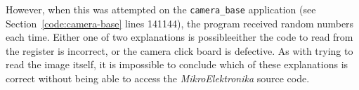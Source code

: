 However, when this was attempted on the \texttt{camera\_base} application
(see Section~\ref{code:camera-base} lines 141\textendash{}144), the program
received random numbers each time.  Either one of two explanations is
possible\textemdash{}either the code to read from the register is incorrect,
or the camera click board is defective. As with trying to read the image
itself, it is impossible to conclude which of these explanations is correct
without being able to access the \textit{MikroElektronika} source code.

